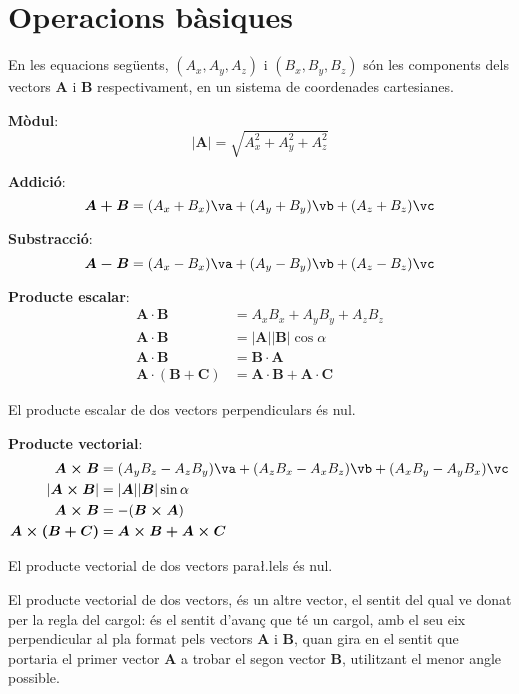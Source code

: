 \documentclass[catalan,a4paper,twoside,11pt]{article}
\begin{document}
\section{Operacions  b\`{a}siques}

En les equacions seg\"{u}ents, $(A_x,A_y,A_z)$ i $(B_x,B_y,B_z)$
s\'{o}n les components dels vectors $\boldsymbol{A}$ i
$\boldsymbol{B}$ respectivament, en un sistema de coordenades
cartesianes.

\textbf{M\`{o}dul}:
\begin{equation}
    |\boldsymbol{A}|=  \sqrt{A_x^2 + A_y^2 + A_z^2}
\end{equation}

\textbf{Addici\'{o}}:
\begin{equation}
    \boldsymbol{A+B}= (A_x+B_x)\va + (A_y+B_y)\vb + (A_z+B_z)\vc
\end{equation}

\textbf{Substracci\'{o}}:
\begin{equation}
    \boldsymbol{A-B}= (A_x-B_x)\va + (A_y-B_y)\vb + (A_z-B_z)\vc
\end{equation}

\textbf{Producte escalar}:
\begin{align}
    \boldsymbol{A\cdot B} &= A_x B_x + A_y B_y + A_z B_z\\
    \boldsymbol{A\cdot B} &=|\boldsymbol{A}| |\boldsymbol{B}| \cos\alpha\\
    \boldsymbol{A\cdot B} &=\boldsymbol{B\cdot A}\\
    \boldsymbol{A\cdot(B+C)} &= \boldsymbol{A\cdot B+ A\cdot C}
\end{align}

El producte escalar de dos vectors perpendiculars  \'{e}s nul.

\textbf{Producte vectorial}:
\begin{align}
    \boldsymbol{A\times B} &= (A_y B_z - A_z B_y)\va + (A_z B_x - A_x B_z)\vb +
    (A_x B_y - A_y B_x)\vc \\
    |\boldsymbol{A\times B}| &=|\boldsymbol{A}| |\boldsymbol{B}| \sin\alpha\\
    \boldsymbol{A\times B} &=-(\boldsymbol{B\times A})\\
    \boldsymbol{A\times(B+C)} &= \boldsymbol{A\times B+ A\times C}
\end{align}

El producte vectorial de dos vectors para{\l.l}els  \'{e}s nul.

El producte vectorial de dos vectors, \'{e}s un altre vector, el
sentit del qual ve donat per la regla del cargol: \'{e}s el sentit
d'avan\c{c} que t\'{e} un cargol, amb el seu eix perpendicular al
pla format pels vectors  $\boldsymbol{A}$ i $\boldsymbol{B}$, quan
gira en el sentit que portaria el primer vector  $\boldsymbol{A}$ a
trobar el segon vector $\boldsymbol{B}$, utilitzant el menor angle
possible.
\end{document}
